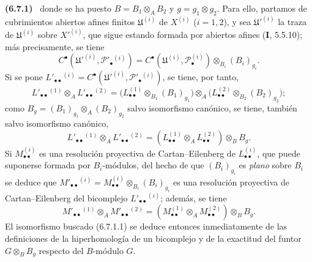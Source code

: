 \documentclass[10pt,oneside]{book}
\newenvironment{env}[1][]{\par\medskip\noindent\textbf{(#1)}\ }{\par}
\begin{document}
\begin{env}[6.7.1]
donde se ha puesto $B=B_1\otimes_A B_2$ y $g=g_1\otimes g_2$. Para ello,
partamos de cubrimientos abiertos afines finitos $\mathfrak U^{(i)}$ de
$X^{(i)}$ ($i=1,2$), y sea $\mathfrak U'^{(i)}$ la traza de
$\mathfrak U^{(i)}$ sobre $X'^{(i)}$, que sigue estando formada por abiertos
afines (\textbf I, 5.5.10); más precisamente, se tiene
\[
  C^\bullet(\mathfrak U'^{(i)},\mathscr P'_\bullet{}^{(i)})
  =C^\bullet(\mathfrak U^{(i)},\mathscr P_\bullet^{(i)})
   \otimes_{B_i}(B_i)_{g_i}.
\]
Si se pone
$L'_{\bullet\bullet}{}^{(i)}
=C^\bullet(\mathfrak U'^{(i)},\mathscr P'_\bullet{}^{(i)})$, se tiene, por
tanto,
\[
  L'_{\bullet\bullet}{}^{(1)}\otimes_A L'_{\bullet\bullet}{}^{(2)}
  =\bigl(L_{\bullet\bullet}^{(1)}\otimes_{B_1}(B_1)_{g_1}\bigr)
   \otimes_A
   \bigl(L_{\bullet\bullet}^{(2)}\otimes_{B_2}(B_2)_{g_2}\bigr);
\]
como $B_g=(B_1)_{g_1}\otimes_A(B_2)_{g_2}$ salvo isomorfismo canónico, se
tiene, también salvo isomorfismo canónico,
\[
  L'_{\bullet\bullet}{}^{(1)}\otimes_A L'_{\bullet\bullet}{}^{(2)}
  =(L_{\bullet\bullet}^{(1)}\otimes_A L_{\bullet\bullet}^{(2)})
    \otimes_B B_g.
\]
Si $M_{\bullet\bullet}^{(i)}$ es una resolución proyectiva de
Cartan--Eilenberg de $L_{\bullet\bullet}^{(i)}$, que puede suponerse formada
por $B_i$-módulos, del hecho de que $(B_i)_{g_i}$ es \emph{plano} sobre $B_i$
se deduce que
$M'_{\bullet\bullet}{}^{(i)}
=M_{\bullet\bullet}^{(i)}\otimes_{B_i}(B_i)_{g_i}$ es una resolución
proyectiva de Cartan--Eilenberg del bicomplejo
$L'_{\bullet\bullet}{}^{(i)}$; además, se tiene
\[
  M'_{\bullet\bullet}{}^{(1)}\otimes_A M'_{\bullet\bullet}{}^{(2)}
  =(M_{\bullet\bullet}^{(1)}\otimes_A M_{\bullet\bullet}^{(2)})
    \otimes_B B_g.
\]
El isomorfismo buscado (6.7.1.1) se deduce entonces inmediatamente de las
definiciones de la hiperhomología de un bicomplejo y de la exactitud del
funtor $G\otimes_B B_g$ respecto del $B$-módulo $G$.
\end{env}
\end{document}
